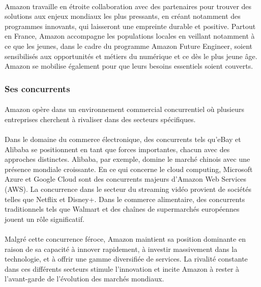\paragraph{}
\vspace{-2em}  %
Amazon travaille en étroite collaboration avec des partenaires pour trouver des solutions aux enjeux mondiaux les plus pressants, en créant notamment des programmes innovants, qui laisseront une empreinte durable et positive.
Partout en France, Amazon accompagne les populations locales en veillant notamment à ce que les jeunes, dans le cadre du programme Amazon Future Engineer, soient sensibilisés aux opportunités et métiers du numérique et ce dès le plus jeune âge. Amazon se mobilise également pour que leurs besoins essentiels soient couverts.

\subsubsection{Ses concurrents}

\paragraph{}
\vspace{-2em}  %
Amazon opère dans un environnement commercial concurrentiel où plusieurs entreprises cherchent à rivaliser dans des secteurs spécifiques. 

\paragraph{}
\vspace{-2em}  %
Dans le domaine du commerce électronique, des concurrents tels qu'eBay et Alibaba se positionnent en tant que forces importantes, chacun avec des approches distinctes. Alibaba, par exemple, domine le marché chinois avec une présence mondiale croissante. En ce qui concerne le cloud computing, Microsoft Azure et Google Cloud sont des concurrents majeurs d'Amazon Web Services (AWS). La concurrence dans le secteur du streaming vidéo provient de sociétés telles que Netflix et Disney+. Dans le commerce alimentaire, des concurrents traditionnels tels que Walmart et des chaînes de supermarchés européennes jouent un rôle significatif. 
\paragraph{}
\vspace{-2em}  %
Malgré cette concurrence féroce, Amazon maintient sa position dominante en raison de sa capacité à innover rapidement, à investir massivement dans la technologie, et à offrir une gamme diversifiée de services. La rivalité constante dans ces différents secteurs stimule l'innovation et incite Amazon à rester à l'avant-garde de l'évolution des marchés mondiaux.

